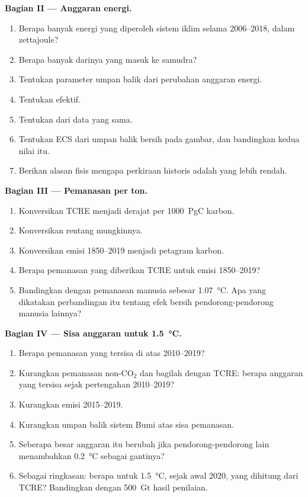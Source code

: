 \begin{problem}
\noindent\textbf{Bagian II --- Anggaran energi.}
\begin{enumerate}[resume]
  \item Berapa banyak energi yang diperoleh sistem iklim selama 2006--2018, dalam zettajoule?
  \item Berapa banyak darinya yang masuk ke samudra?
  \item Tentukan parameter umpan balik dari perubahan anggaran energi.
  \item Tentukan  efektif.
  \item Tentukan  dari data yang sama.
  \item Tentukan ECS dari umpan balik bersih pada gambar, dan bandingkan kedua nilai itu.
  \item Berikan alasan fisis mengapa perkiraan historis adalah yang lebih rendah.
\end{enumerate}

\noindent\textbf{Bagian III --- Pemanasan per ton.}
\begin{enumerate}[resume]
  \item Konversikan TCRE menjadi derajat per \qty{1000}{PgC} karbon.
  \item Konversikan rentang mungkinnya.
  \item Konversikan emisi 1850--2019 menjadi petagram karbon.
  \item Berapa pemanasan yang diberikan TCRE untuk emisi 1850--2019?
  \item Bandingkan dengan pemanasan manusia sebesar \qty{1.07}{\celsius}. Apa yang dikatakan perbandingan itu tentang
        efek bersih pendorong-pendorong manusia lainnya?
\end{enumerate}

\noindent\textbf{Bagian IV --- Sisa anggaran untuk \qty{1.5}{\celsius}.}
\begin{enumerate}[resume]
  \item Berapa pemanasan yang tersisa di atas 2010--2019?
  \item Kurangkan pemanasan non-CO$_2$ dan bagilah dengan TCRE: berapa anggaran yang tersisa sejak pertengahan
        2010--2019?
  \item Kurangkan emisi 2015--2019.
  \item Kurangkan umpan balik sistem Bumi atas sisa pemanasan.
  \item Seberapa besar anggaran itu berubah jika pendorong-pendorong lain menambahkan \qty{0.2}{\celsius} sebagai gantinya?
  \item Sebagai ringkasan: berapa  untuk \qty{1.5}{\celsius}, sejak awal
        2020, yang dihitung dari TCRE? Bandingkan dengan \qty{500}{Gt} hasil penilaian.
\end{enumerate}
\end{problem}
